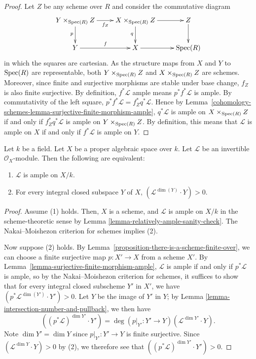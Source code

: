 \begin{proof}
Let $Z$ be any scheme over $R$ and consider the commutative diagram
$$
\xymatrix{
  Y \times_{\Spec(R)} Z \ar[r]_{f_Z} \ar[d]_p  &
  X \times_{\Spec(R)} Z \ar[r] \ar[d]_q &
  Z \ar[d] \\
  Y \ar[r]^f & X \ar[r] & \Spec(R)
}
$$
in which the squares are cartesian.
As the structure maps from $X$ and $Y$ to $\mathop{\rm Spec}(R)$ are representable, both
$Y \times_{\mathop{\rm Spec}(R)} Z$ and $X \times_{\mathop{\rm Spec}(R)} Z$ are schemes.
Moreover, since finite and surjective morphisms are stable under base change,
$f_Z$ is also finite surjective.
By definition, $f^*\mathcal{L}$ ample means $p^*f^*\mathcal{L}$ is ample.
By commutativity of the left square, $p^*f^*\mathcal{L} = f_Z^*q^*\mathcal{L}$.
Hence by Lemma~\ref{cohomology-schemes-lemma-surjective-finite-morphism-ample},
$q^*\mathcal{L}$ is ample on $X \times_{\mathop{\rm Spec}(R)} Z$ if and only if
$f_Z^*q^*\mathcal{L}$ is ample on $Y \times_{\mathop{\rm Spec}(R)} Z$.
By definition, this means that $\mathcal{L}$ is ample on $X$ if and only if
$f^*\mathcal{L}$ is ample on $Y$.
\end{proof}

\begin{theorem}
  Let $k$ be a field. Let $X$ be a proper algebraic space over $k$. Let
  $\mathcal{L}$ be an invertible $\mathcal{O}_X$-module. Then the following are
  equivalent:
  \begin{enumerate}
    \item $\mathcal{L}$ is ample on $X/k$.
    \item For every integral closed subspace $Y$ of $X$, $(\mathcal{L}^{\dim(Y)}
      \cdot Y) > 0$.
  \end{enumerate}
\end{theorem}
\begin{proof}
  Assume (1) holds. Then, $X$ is a scheme, and $\mathcal{L}$ is ample on $X/k$
  in the scheme-theoretic sense by Lemma
  \ref{lemma-relatively-ample-sanity-check}.
  The Nakai--Moishezon criterion for schemes implies (2).

  Now suppose (2) holds.
  By Lemma~\ref{proposition-there-is-a-scheme-finite-over}, we can choose
  a finite surjective map $p : X' \to X$ from a scheme $X'$.
  By Lemma~\ref{lemma-surjective-finite-morphism-ample}, $\mathcal{L}$ is
  ample if and only if $p^*\mathcal{L}$ is ample, so by the Nakai--Moishezon
  criterion for schemes, it suffices to show that for every integral closed
  subscheme $Y'$ in $X'$, we have $(p^*\mathcal{L}^{\dim(Y')} \cdot Y') > 0$.
  Let $Y$ be the image of $Y'$ in $Y$; by Lemma
  \ref{lemma-intersection-number-and-pullback}, we then have
  $$
  ( (p^*\mathcal{L})^{\dim Y'} \cdot Y') = \deg(p\rvert_{Y'} : Y' \to
  Y)(\mathcal{L}^{\dim Y'} \cdot Y).
  $$
  Note $\dim Y' = \dim Y$ since $p\rvert_{Y'} : Y' \to Y$ is finite surjective.
  Since $(\mathcal{L}^{\dim Y} \cdot Y) > 0$ by (2), we therefore see that
  $( (p^*\mathcal{L})^{\dim Y'} \cdot Y') > 0$.
\end{proof}






